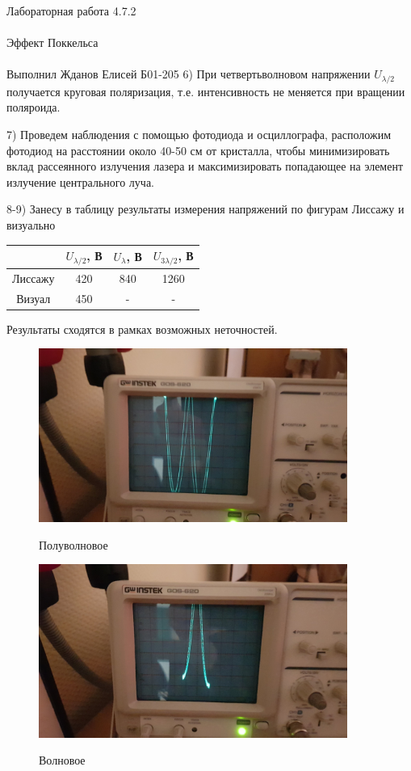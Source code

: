 \documentclass{astroedu-lab}
\begin{document}
\begin{problem}{\huge Лабораторная работа 4.7.2\\\\Эффект Поккельса\\\\Выполнил Жданов Елисей Б01-205}
6) При четвертьволновом напряжении $U_{\lambda / 2}$ получается круговая поляризация, т.е. интенсивность не меняется при вращении поляроида.

7) Проведем наблюдения с помощью фотодиода и осциллографа, расположим фотодиод на расстоянии около 40-50 см от кристалла, чтобы минимизировать вклад рассеянного излучения лазера и максимизировать попадающее на элемент излучение центрального луча.

8-9) Занесу в таблицу результаты измерения напряжений по фигурам Лиссажу и визуально

\begin{center}
\begin{tabular}{|c|c|c|c|}
\hline 
& $U_{\lambda / 2}$, В & $U_{\lambda}$, В & $U_{3 \lambda / 2}$, В\\
\hline 
Лиссажу & 420 & 840 & 1260 \\
Визуал  & 450 & - & - \\
\hline

\end{tabular}
\end{center}

Результаты сходятся в рамках возможных неточностей.

\begin{figure}[!h]
	\centering
	\includegraphics[width=0.9\textwidth]{1jErPQcC5tQ.jpg}
	\label{fig:boiler}
	\caption{Полуволновое}
\end{figure}

\begin{figure}[!h]
	\centering
	\includegraphics[width=0.9\textwidth]{wKRP0k59XyQ.jpg}
	\label{fig:boiler}
	\caption{Волновое}
\end{figure}


\end{problem}
\end{document}
